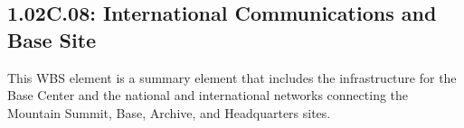 \subsection*{1.02C.08: International Communications and Base Site}

This WBS element is a summary element that includes the infrastructure for the
Base Center and the national and international networks connecting the
Mountain Summit, Base, Archive, and Headquarters sites.

